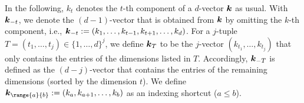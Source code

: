 In the following, $k_t$ denotes the $t$-th component of a $d$-vector ${\boldsymbol{k}}$
as usual.
With ${\boldsymbol{k}}_{-t}$, we denote the $(d-1)$-vector that is obtained from ${\boldsymbol{k}}$
by omitting the $k$-th component,
i.e., ${\boldsymbol{k}}_{-t} := (k_1, \dotsc, k_{t-1}, k_{t+1}, \dotsc, k_d)$.
For a $j$-tuple $T = (t_1, \dotsc, t_j) \in \{1, \dotsc, d\}^j$,
we define ${\boldsymbol{k}}_T$ to be the $j$-vector $(k_{t_1}, \dotsc, k_{t_j})$
that only contains the entries of the dimensions listed in $T$.
Accordingly, ${\boldsymbol{k}}_{-T}$ is defined as the $(d-j)$-vector
that contains the entries of the remaining dimensions
(sorted by the dimension $t$).
We define $\*k_{\range{a}{b}} := (k_a, k_{a+1}, \dotsc, k_b)$
as an indexing shortcut ($a \le b$).
